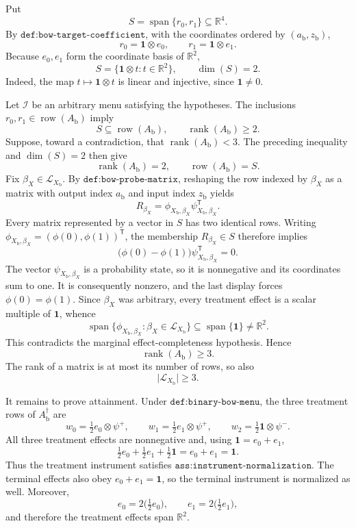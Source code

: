 Put
\[
S=\operatorname{span}\{r_0,r_1\}\subseteq\mathbb R^4.
\]
By \(\texttt{def:bow-target-coefficient}\), with the coordinates ordered by
\((a_{\mathrm b},z_{\mathrm b})\),
\[
r_0=\mathbf 1\otimes e_0,
\qquad
r_1=\mathbf 1\otimes e_1.
\]
Because \(e_0,e_1\) form the coordinate basis of \(\mathbb R^2\),
\[
S=\{\mathbf 1\otimes t:t\in\mathbb R^2\},
\qquad
\dim(S)=2.
\]
Indeed, the map \(t\mapsto\mathbf 1\otimes t\) is linear and injective,
since \(\mathbf 1\neq0\).

Let \(\mathcal I\) be an arbitrary menu satisfying the hypotheses.  The
inclusions \(r_0,r_1\in\operatorname{row}(A_{\mathrm b})\) imply
\[
S\subseteq\operatorname{row}(A_{\mathrm b}),
\qquad
\operatorname{rank}(A_{\mathrm b})\geq2.
\]
Suppose, toward a contradiction, that
\(\operatorname{rank}(A_{\mathrm b})<3\).  The preceding inequality and
\(\dim(S)=2\) then give
\[
\operatorname{rank}(A_{\mathrm b})=2,
\qquad
\operatorname{row}(A_{\mathrm b})=S.
\]
Fix \(\beta_X\in\mathcal L_{X_{\mathrm b}}\).  By
\(\texttt{def:bow-probe-matrix}\), reshaping the row indexed by \(\beta_X\)
as a matrix with output index \(a_{\mathrm b}\) and input index
\(z_{\mathrm b}\) yields
\[
R_{\beta_X}
=\phi_{X_{\mathrm b},\beta_X}
 \psi_{X_{\mathrm b},\beta_X}^{\mathsf T}.
\]
Every matrix represented by a vector in \(S\) has two identical rows.
Writing
\(\phi_{X_{\mathrm b},\beta_X}=(\phi(0),\phi(1))^{\mathsf T}\), the membership
\(R_{\beta_X}\in S\) therefore implies
\[
\bigl(\phi(0)-\phi(1)\bigr)
\psi_{X_{\mathrm b},\beta_X}^{\mathsf T}=0.
\]
The vector \(\psi_{X_{\mathrm b},\beta_X}\) is a probability state, so it is
nonnegative and its coordinates sum to one.  It is consequently nonzero,
and the last display forces \(\phi(0)=\phi(1)\).  Since \(\beta_X\) was
arbitrary, every treatment effect is a scalar multiple of \(\mathbf 1\),
whence
\[
\operatorname{span}\{\phi_{X_{\mathrm b},\beta_X}:
\beta_X\in\mathcal L_{X_{\mathrm b}}\}
\subseteq\operatorname{span}\{\mathbf 1\}
\neq\mathbb R^2.
\]
This contradicts the marginal effect-completeness hypothesis.  Hence
\[
\operatorname{rank}(A_{\mathrm b})\geq3.
\]
The rank of a matrix is at most its number of rows, so also
\[
\lvert\mathcal L_{X_{\mathrm b}}\rvert\geq3.
\]

It remains to prove attainment.  Under \(\texttt{def:binary-bow-menu}\), the
three treatment rows of \(A_{\mathrm b}^{\dagger}\) are
\[
w_0=\tfrac12e_0\otimes\psi^{+},
\qquad
w_1=\tfrac12e_1\otimes\psi^{+},
\qquad
w_2=\tfrac12\mathbf 1\otimes\psi^{-}.
\]
All three treatment effects are nonnegative and, using
\(\mathbf 1=e_0+e_1\),
\[
\tfrac12e_0+\tfrac12e_1+\tfrac12\mathbf 1
=e_0+e_1
=\mathbf 1.
\]
Thus the treatment instrument satisfies
\(\texttt{ass:instrument-normalization}\).  The terminal effects also obey
\(e_0+e_1=\mathbf 1\), so the terminal instrument is normalized as well.
Moreover,
\[
e_0=2\bigl(\tfrac12e_0\bigr),
\qquad
e_1=2\bigl(\tfrac12e_1\bigr),
\]
and therefore the treatment effects span \(\mathbb R^2\).

